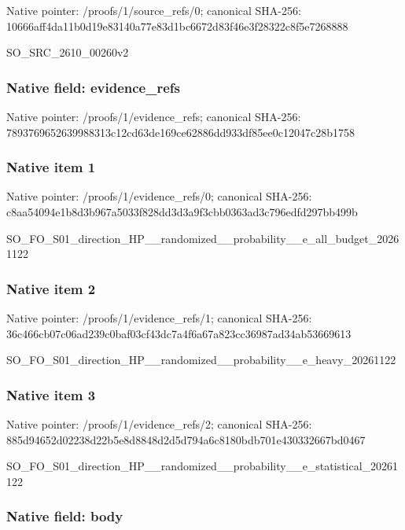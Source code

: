 \documentclass[10pt,a4paper]{article}
\begin{document}
Native pointer: /proofs/1/source\_refs/0; canonical SHA-256: 10666aff4da11b0d19e83140\allowbreak{}a77e83d1bc6672d83f46e3f2\allowbreak{}8322c8f5e7268888


SO\_SRC\_2610\_00260v2


\subsubsection{Native field: evidence\_refs}


Native pointer: /proofs/1/evidence\_refs; canonical SHA-256: 7893769652639988313c12cd\allowbreak{}63de169ce62886dd933df85e\allowbreak{}e0c12047c28b1758



\subsubsection{Native item 1}


Native pointer: /proofs/1/evidence\_refs/0; canonical SHA-256: c8aa54094e1b8d3b967a5033\allowbreak{}f828dd3d3a9f3cbb0363ad3c\allowbreak{}796edfd297bb499b


SO\_FO\_S01\_direction\_HP\_\_\allowbreak{}randomized\_\_probability\_\allowbreak{}\_e\_all\_budget\_20261122


\subsubsection{Native item 2}


Native pointer: /proofs/1/evidence\_refs/1; canonical SHA-256: 36c466cb07c06ad239c0baf0\allowbreak{}3cf43dc7a4f6a67a823cc369\allowbreak{}87ad34ab53669613


SO\_FO\_S01\_direction\_HP\_\_\allowbreak{}randomized\_\_probability\_\allowbreak{}\_e\_heavy\_20261122


\subsubsection{Native item 3}


Native pointer: /proofs/1/evidence\_refs/2; canonical SHA-256: 885d94652d02238d22b5e8d8\allowbreak{}848d2d5d794a6c8180bdb701\allowbreak{}e430332667bd0467


SO\_FO\_S01\_direction\_HP\_\_\allowbreak{}randomized\_\_probability\_\allowbreak{}\_e\_statistical\_20261122


\subsubsection{Native field: body}
\end{document}
